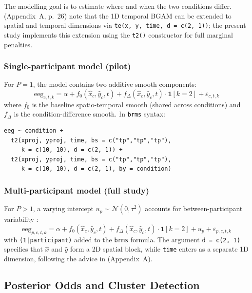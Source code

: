 \documentclass[12pt, a4paper]{article}
\begin{document}
The modelling goal is to estimate where and when the two conditions differ.
\citet{Nalborczyk2025} (Appendix~A, p.~26) note that the 1D temporal BGAM
can be extended to spatial and temporal dimensions via
\texttt{te(x, y, time, d = c(2, 1))}; the present study implements this
extension using the \texttt{t2()} constructor for full marginal penalties.

\subsubsection{Single-participant model (pilot)}

For $P = 1$, the model contains two additive smooth components:
%
\begin{equation}\label{eq:model_pilot}
  \mathrm{eeg}_{c,t,k}
  = \alpha
    + f_0(\hat{x}_c, \hat{y}_c, t)
    + f_\Delta(\hat{x}_c, \hat{y}_c, t) \cdot \mathbf{1}[k=2]
    + \varepsilon_{c,t,k}
\end{equation}
%
where $f_0$ is the baseline spatio-temporal smooth (shared across conditions)
and $f_\Delta$ is the condition-difference smooth.
In \texttt{brms} syntax:
%
\begin{verbatim}
eeg ~ condition +
  t2(xproj, yproj, time, bs = c("tp","tp","tp"),
     k = c(10, 10), d = c(2, 1)) +
  t2(xproj, yproj, time, bs = c("tp","tp","tp"),
     k = c(10, 10), d = c(2, 1), by = condition)
\end{verbatim}

\subsubsection{Multi-participant model (full study)}

For $P > 1$, a varying intercept $u_p \sim \mathcal{N}(0,\tau^2)$ accounts
for between-participant variability \citep{Nalborczyk2025}:
%
\begin{equation}\label{eq:model_full}
  \mathrm{eeg}_{p,c,t,k}
  = \alpha
    + f_0(\hat{x}_c, \hat{y}_c, t)
    + f_\Delta(\hat{x}_c, \hat{y}_c, t) \cdot \mathbf{1}[k=2]
    + u_p
    + \varepsilon_{p,c,t,k}
\end{equation}
%
with \texttt{(1|participant)} added to the \texttt{brms} formula.
The argument \texttt{d = c(2, 1)} specifies that $\hat{x}$ and $\hat{y}$
form a 2D spatial block, while \texttt{time} enters as a separate 1D
dimension, following the advice in \citet{Nalborczyk2025} (Appendix~A).

\subsection{Posterior Odds and Cluster Detection}
\end{document}
